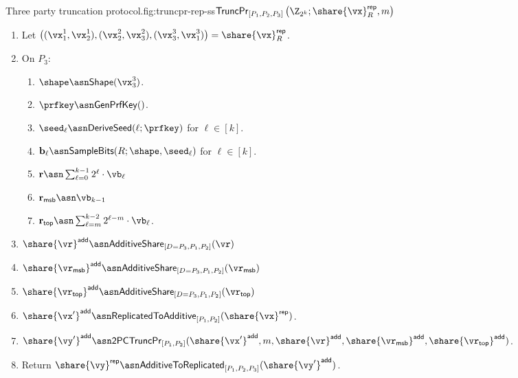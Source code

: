 \begin{Boxfig}{Three party truncation protocol.}{fig:truncpr-rep-ss}{$\mathsf{TruncPr}_{[P_1, P_2, P_3]} \left(\Z_{2^k}; \share{\vx}^{\mathsf{rep}}_{R}, m \right)$}
\begin{enumerate}
  \item Let $\left( (\vx_1^1, \vx_2^1), (\vx_2^2, \vx_3^2), (\vx_3^3, \vx_1^3) \right) = \share{\vx}^{\mathsf{rep}}_{R}$.

  \item On $P_3$:
  \begin{enumerate}
    \item $\shape \asn \mathsf{Shape}(\vx^3_3)$.
    \item $\prfkey \asn \mathsf{GenPrfKey}()$.
    \item $\seed_\ell \asn \mathsf{DeriveSeed}(\ell; \prfkey)$ for $\ell \in [k]$.
    \item $\mathbf{b}_\ell \asn \mathsf{SampleBits}(R; \shape, \seed_\ell)$ for $\ell \in [k]$.
    \item $\mathbf{r} \asn \sum_{\ell=0}^{k-1}2^\ell \cdot \vb_\ell$
    \item $\mathbf{r}_{\mathsf{msb}} \asn \vb_{k-1}$
    \item $\mathbf{r}_{\mathsf{top}} \asn \sum_{\ell=m}^{k-2} 2^{\ell-m} \cdot \vb_\ell$.
  \end{enumerate}

  \item $\share{\vr}^{\mathsf{add}} \asn \mathsf{AdditiveShare}_{[D=P_3, P_1, P_2]}(\vr)$

  \item $\share{\vr_{\mathsf{msb}}}^{\mathsf{add}} \asn \mathsf{AdditiveShare}_{[D=P_3, P_1, P_2]}(\vr_{\mathsf{msb}})$

  \item $\share{\vr_{\mathsf{top}}}^{\mathsf{add}} \asn \mathsf{AdditiveShare}_{[D=P_3, P_1, P_2]}(\vr_{\mathsf{top}})$

  \item $\share{\vx'}^{\mathsf{add}} \asn \mathsf{ReplicatedToAdditive}_{[P_1, P_2]}(\share{\vx}^{\mathsf{rep}})$.

  \item $\share{\vy'}^{\mathsf{add}} \asn \mathsf{2PCTruncPr}_{[P_1, P_2]}(\share{\vx'}^{\mathsf{add}}, m, \share{\vr}^{\mathsf{add}}, \share{\vr_{\mathsf{msb}}}^{\mathsf{add}}, \share{\vr_{\mathsf{top}}}^{\mathsf{add}} )$.

  \item Return $\share{\vy}^{\mathsf{rep}} \asn \mathsf{AdditiveToReplicated}_{[P_1, P_2, P_3]}(\share{\vy'}^{\mathsf{add}})$.


\end{enumerate}
\end{Boxfig}
